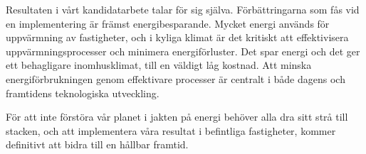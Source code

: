 \documentclass[11pt,a4paper]{article}
\begin{document}
\begin{multicols}{2}
Resultaten i vårt kandidatarbete talar för sig själva. Förbättringarna som fås vid en implementering är främst energibesparande. Mycket energi används för uppvärmning av fastigheter, och i kyliga klimat är det kritiskt att effektivisera uppvärmningsprocesser och minimera energiförluster. Det spar energi och det ger ett behagligare inomhusklimat, till en väldigt låg kostnad. Att minska energiförbrukningen genom effektivare processer är centralt i både dagens och framtidens teknologiska utveckling. 

För att inte förstöra vår planet i jakten på energi behöver alla dra sitt strå till stacken, och att implementera våra resultat i befintliga fastigheter, kommer definitivt att bidra till en hållbar framtid.

\end{multicols}
\end{document}
